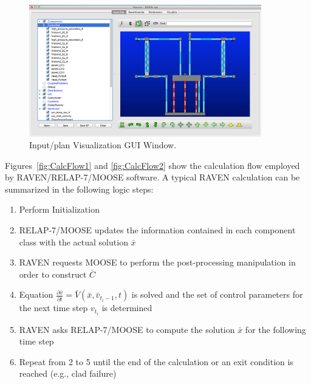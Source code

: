 \documentclass{mc2013}
\begin{document}
\begin{figure}
   \centering
    \includegraphics[width=0.9\textwidth]{figures/RavenGUI.PNG}
    \caption{Input/plan Visualization GUI Window.}
    \label{fig:RavenGUI}
\end{figure}
\label{sec:swLayoutCalcFlow}
Figures~\ref{fig:CalcFlow1} and \ref{fig:CalcFlow2} show the calculation flow employed by RAVEN/RELAP-7/MOOSE software. 
A typical RAVEN calculation can be summarized in the following logic steps:
\begin{enumerate}
   \item Perform Initialization
   \item RELAP-7/MOOSE updates the information contained in each component class with the actual solution $\bar{x}$
   \item RAVEN requests MOOSE to perform the post-processing manipulation in order to construct $\bar{C}$ 
   \item Equation 
$\frac{\partial \bar{v}}{\partial t} = \bar{V}(\bar{x},\bar{v}_{t_{i}-1},t) $
is solved and the set of control parameters for the next time step $v_{t_{i}}$ is determined
  \item RAVEN asks RELAP-7/MOOSE to compute the solution $\bar{x}$ for the following time step
  \item Repeat from 2 to 5 until the end of the calculation or an exit condition is reached (e.g., clad failure)
\end{enumerate}
\end{document}
